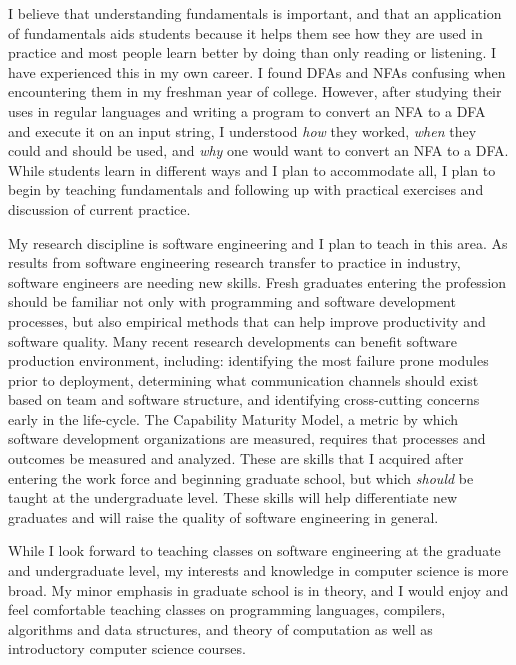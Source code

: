 \documentclass[10pt]{article}
\begin{document}
I believe that understanding fundamentals is important, and that an application
of fundamentals aids students because it helps them see how they are used in
practice and most people learn better by doing than only reading or listening.
I have experienced this in my own career.  I found DFAs and NFAs confusing when
encountering them in my freshman year of college.  However, after studying
their uses in regular languages and writing a program to convert an NFA to a
DFA and execute it on an input string, I understood \emph{how} they worked,
\emph{when} they could and should be used, and \emph{why} one would want to
convert an NFA to a DFA.  While students learn in different ways and I plan to
accommodate all, I plan to begin by teaching fundamentals and following up with
practical exercises and discussion of current practice.

My research discipline is software engineering and I plan to teach in this
area.  As results from software engineering research transfer to practice in
industry, software engineers are needing new skills. Fresh graduates entering the
profession should be familiar not only with programming and software
development processes, but also empirical methods that can help improve
productivity and software quality.  Many recent research developments can
benefit software production environment, including: identifying the most
failure prone modules prior to deployment, determining what communication
channels should exist based on team and software structure, and identifying
cross-cutting concerns early in the life-cycle.  The Capability Maturity Model,
a metric by which software development organizations are measured, requires
that processes and outcomes be measured and analyzed.  These are skills that I
acquired after entering the work force and beginning graduate school, but which
\emph{should} be taught at the undergraduate level.  These skills will help
differentiate new graduates and will raise the quality of software engineering
in general.

While I look forward to teaching classes on software engineering at the
graduate and undergraduate level, my interests and knowledge in computer
science is more broad.  My minor emphasis in graduate school is in theory, and I
would enjoy and feel comfortable teaching classes on programming languages,
compilers, algorithms and data structures, and theory of computation as well as
introductory computer science courses.
\end{document}
